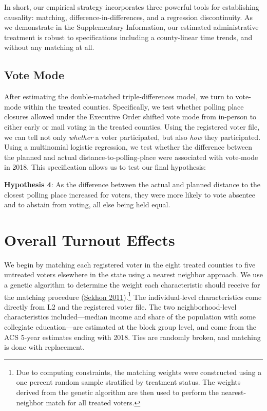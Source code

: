 \documentclass[
  12pt,
]{article}
\begin{document}
In short, our empirical strategy incorporates three powerful tools for establishing causality: matching, difference-in-differences, and a regression discontinuity. As we demonstrate in the Supplementary Information, our estimated administrative treatment is robust to specifications including a county-linear time trends, and without any matching at all.

\hypertarget{vote-mode}{%
\subsection*{Vote Mode}\label{vote-mode}}

After estimating the double-matched triple-differences model, we turn to vote-mode within the treated counties. Specifically, we test whether polling place closures allowed under the Executive Order shifted vote mode from in-person to either early or mail voting in the treated counties. Using the registered voter file, we can tell not only \emph{whether} a voter participated, but also \emph{how} they participated. Using a multinomial logistic regression, we test whether the difference between the planned and actual distance-to-polling-place were associated with vote-mode in 2018. This specification allows us to test our final hypothesis:

\textbf{Hypothesis 4}: As the difference between the actual and planned distance to the closest polling place increased for voters, they were more likely to vote absentee and to abstain from voting, all else being held equal.

\hypertarget{overall-turnout-effects}{%
\section*{Overall Turnout Effects}\label{overall-turnout-effects}}

We begin by matching each registered voter in the eight treated counties to five untreated voters elsewhere in the state using a nearest neighbor approach. We use a genetic algorithm to determine the weight each characteristic should receive for the matching procedure (\protect\hyperlink{ref-Sekhon2011}{Sekhon 2011}).\footnote{Due to computing constraints, the matching weights were constructed using a one percent random sample stratified by treatment status. The weights derived from the genetic algorithm are then used to perform the nearest-neighbor match for all treated voters.} The individual-level characteristics come directly from L2 and the registered voter file. The two neighborhood-level characteristics included---median income and share of the population with some collegiate education---are estimated at the block group level, and come from the ACS 5-year estimates ending with 2018. Ties are randomly broken, and matching is done with replacement.
\end{document}
